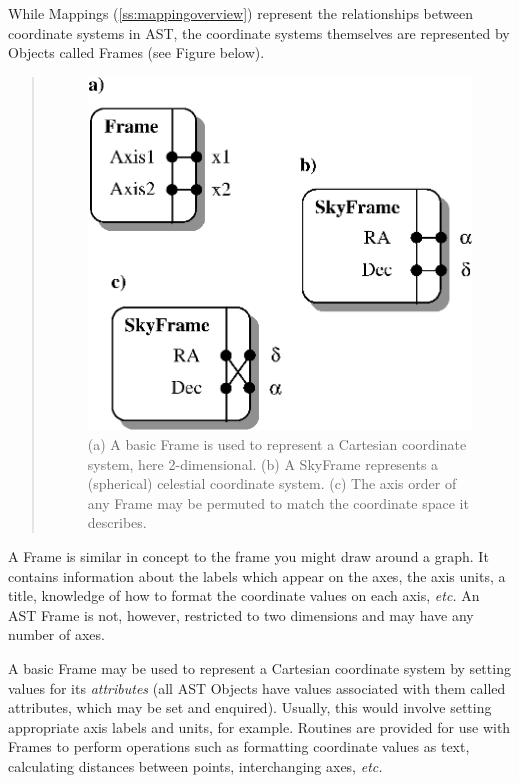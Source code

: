 \documentclass[twoside,11pt]{article}
\newcommand{\secref}[1]{\S\ref{#1}}
\renewcommand{\secref}[1]{\ref{#1}}
\begin{document}
\begin{htmlonly}
   While Mappings (\secref{ss:mappingoverview}) represent the
   relationships between coordinate systems in AST, the coordinate
   systems themselves are represented by Objects called Frames (see
   Figure below).
   \begin{quote}
   \begin{figure}
   \label{fig:frames}
   \includegraphics[scale=1.5]{sun210_figures/frames.eps}
   \caption{(a) A basic Frame is used to represent a Cartesian coordinate
   system, here 2-dimensional. (b) A SkyFrame represents a (spherical)
   celestial coordinate system. (c) The axis order of any Frame may be
   permuted to match the coordinate space it describes.}
   \end{figure}
   \end{quote}
\end{htmlonly}
A Frame is similar in concept to the frame you might draw around a
graph.  It contains information about the labels which appear on the
axes, the axis units, a title, knowledge of how to format the
coordinate values on each axis, {\em{etc.}}  An AST Frame is not,
however, restricted to two dimensions and may have any number of axes.

A basic Frame may be used to represent a Cartesian coordinate system
by setting values for its {\em attributes} (all AST Objects have
values associated with them called attributes, which may be set and
enquired).  Usually, this would involve setting appropriate axis
labels and units, for example.  Routines are provided for use with
Frames to perform operations such as formatting coordinate values as
text, calculating distances between points, interchanging axes,
{\em{etc.}}
\end{document}
